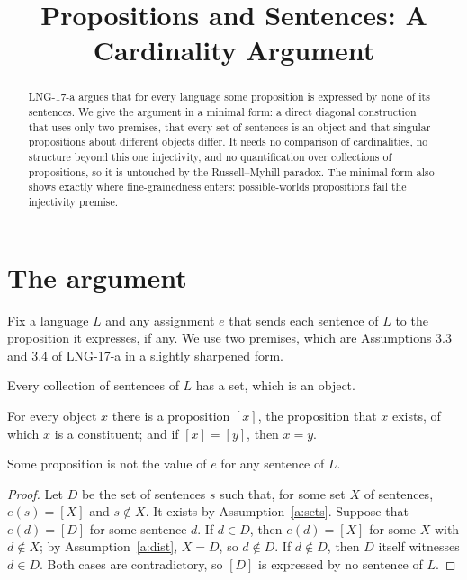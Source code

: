 \documentclass{situationist-preprint}
\title{Propositions and Sentences: A Cardinality Argument}
\begin{document}
\maketitle

\begin{abstract}
LNG-17-a argues that for every language some proposition is expressed by none of its sentences. We give the argument in a minimal form: a direct diagonal construction that uses only two premises, that every set of sentences is an object and that singular propositions about different objects differ. It needs no comparison of cardinalities, no structure beyond this one injectivity, and no quantification over collections of propositions, so it is untouched by the Russell--Myhill paradox. The minimal form also shows exactly where fine-grainedness enters: possible-worlds propositions fail the injectivity premise.
\end{abstract}

\section{The argument}

Fix a language $L$ and any assignment $e$ that sends each sentence of $L$ to the proposition it expresses, if any. We use two premises, which are Assumptions 3.3 and 3.4 of LNG-17-a in a slightly sharpened form.

\begin{assumption}[Sets]\label{a:sets}
Every collection of sentences of $L$ has a set, which is an object.
\end{assumption}

\begin{assumption}\label{a:dist}
For every object $x$ there is a proposition $[x]$, the proposition that $x$ exists, of which $x$ is a constituent; and if $[x] = [y]$, then $x = y$.
\end{assumption}

\begin{theorem}\label{t:diag}
Some proposition is not the value of $e$ for any sentence of $L$.
\end{theorem}

\begin{proof}
Let $D$ be the set of sentences $s$ such that, for some set $X$ of sentences, $e(s) = [X]$ and $s \notin X$. It exists by Assumption~\ref{a:sets}. Suppose that $e(d) = [D]$ for some sentence $d$. If $d \in D$, then $e(d) = [X]$ for some $X$ with $d \notin X$; by Assumption~\ref{a:dist}, $X = D$, so $d \notin D$. If $d \notin D$, then $D$ itself witnesses $d \in D$. Both cases are contradictory, so $[D]$ is expressed by no sentence of $L$.
\end{proof}
\end{document}
